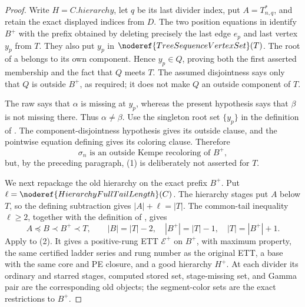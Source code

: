\begin{proof}
Write \(H=C.\mathit{hierarchy}\), let \(q\) be its last divider index,
put \(A=T_{n,q}^{*}\), and retain the exact displayed indices from \(D\).
The two position equations in
 identify \(B^+\) with the
prefix obtained by deleting precisely the last edge \(e_p\) and last
vertex \(y_p\) from \(T\).  They also put \(y_p\) in
\(\noderef{TreeSequenceVertexSet}(T)\).  The root of a
 belongs to its own component.  Hence
\(y_p\in Q\), proving both the first asserted membership and the fact that
\(Q\) meets \(T\).  The assumed disjointness says only that \(Q\) is
outside \(B^+\), as required; it does not make \(Q\) an outside component
of \(T\).

The raw  says that
\(\alpha\) is missing at \(y_p\), whereas the
present hypothesis says that \(\beta\) is not missing there.  Thus
\(\alpha\ne\beta\).  Use the singleton root set \(\{y_p\}\) in the
definition of .  The component-disjointness
hypothesis gives its outside clause, and the pointwise equation defining
 gives its coloring clause.  Therefore
\[
 \sigma_n\text{ is an outside Kempe recoloring of }B^+,
                                                               \tag{1}
\]
but, by the preceding paragraph, (1) is deliberately not asserted for
\(T\).

We next repackage the old hierarchy on the exact prefix \(B^+\).  Put
\(\ell=\noderef{HierarchyFullTailLength}(C)\).  The hierarchy stages put
\(A\) below \(T\), so the defining subtraction gives
\(|A|+\ell=|T|\).  The common-tail inequality \(\ell\ge2\), together
with the definition of , gives
\[
 A\preccurlyeq B\prec B^+\prec T,\qquad
 |B|=|T|-2,\quad |B^+|=|T|-1,\quad |T|=|B^+|+1.            \tag{2}
\]
Apply  to (2).  It gives a
positive-rung ETT \(\mathcal E^+\) on \(B^+\), with maximum property, the
same certified ladder series and rung number as the original ETT, a base
with the same core and PE closure, and a good hierarchy \(H^+\).  At each
divider its ordinary and starred stages, computed stored set, stage-missing
set, and Gamma pair are the corresponding old objects; the segment-color
sets are the exact restrictions to \(B^+\).


\end{proof}
